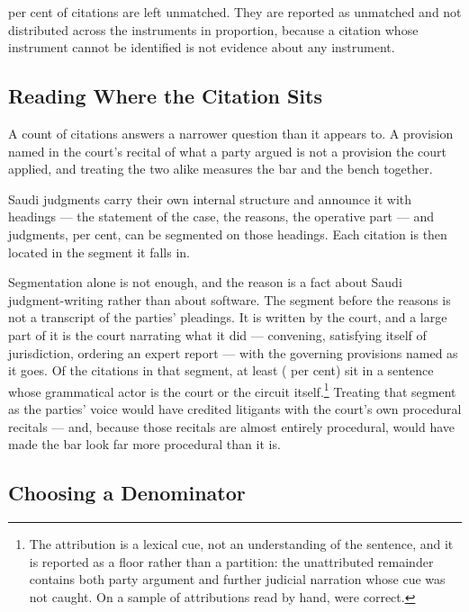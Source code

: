 \documentclass[12pt]{article}
\begin{document}
\nUnmatchedShare{} per cent of citations are left unmatched. They are reported
as unmatched and not distributed across the instruments in proportion, because
a citation whose instrument cannot be identified is not evidence about any
instrument.

\subsection{Reading Where the Citation Sits}

A count of citations answers a narrower question than it appears to. A
provision named in the court's recital of what a party argued is not a
provision the court applied, and treating the two alike measures the bar and
the bench together.

Saudi judgments carry their own internal structure and announce it with
headings --- the statement of the case, the reasons, the operative part ---
and \nSegmented{} judgments, \nSegmentedShare{} per cent, can be segmented on
those headings. Each citation is then located in the segment it falls in.

Segmentation alone is not enough, and the reason is a fact about Saudi
judgment-writing rather than about software. The segment before the reasons is
not a transcript of the parties' pleadings. It is written by the court, and a
large part of it is the court narrating what it did --- convening, satisfying
itself of jurisdiction, ordering an expert report --- with the governing
provisions named as it goes. Of the \nRecitalCitations{} citations in that
segment, at least \nRecitalByCourt{} (\nRecitalByCourtShare{} per cent) sit in
a sentence whose grammatical actor is the court or the circuit
itself.\footnote{The attribution is a lexical cue, not an understanding of the
sentence, and it is reported as a floor rather than a partition: the
unattributed remainder contains both party argument and further judicial
narration whose cue was not caught. On a sample of \nVoiceSample{} attributions
read by hand, \nVoiceCorrect{} were correct.} Treating that segment as the parties' voice
would have credited litigants with the court's own procedural recitals ---
and, because those recitals are almost entirely procedural, would have made
the bar look far more procedural than it is.

\subsection{Choosing a Denominator}
\label{sub:denominator}
\end{document}
